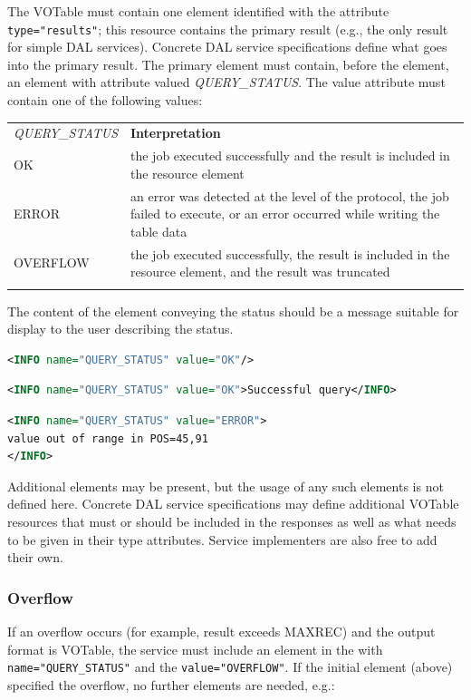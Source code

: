 \documentclass[11pt,letter]{ivoa}
\begin{document}
The VOTable must contain one   element identified with the attribute
\verb|type="results"|; this resource contains the primary result (e.g., the only result
for simple DAL services). Concrete DAL service specifications define what goes
into the primary result. The primary  element must contain, before the
 element, an
 element with attribute  valued \emph{QUERY\_STATUS}. The value
attribute must contain one of the following values:

\begin{tabular}{l p{8cm}}
\sptablerule
\emph{QUERY\_STATUS}&\textbf{Interpretation}\\
\sptablerule
OK & the job executed successfully and the result is included in the
resource element\\
ERROR & an error was detected at the level of the protocol, the job failed to
execute, or an error occurred while writing the table data \\
OVERFLOW & the job executed successfully, the result is included in the
resource element, and the result was truncated \\
\sptablerule
\label{tab:query-status}
\end{tabular}

The content of the  element conveying the status should be a message
suitable for display to the user describing the status.

\begin{lstlisting}[language=XML]
<INFO name="QUERY_STATUS" value="OK"/>
\end{lstlisting}

\begin{lstlisting}[language=XML]
<INFO name="QUERY_STATUS" value="OK">Successful query</INFO>
\end{lstlisting}

\begin{lstlisting}[language=XML]
<INFO name="QUERY_STATUS" value="ERROR">
value out of range in POS=45,91
</INFO>
\end{lstlisting}

Additional  elements may be present, but the usage of any such elements
is not defined here. Concrete DAL service specifications may define additional
VOTable resources that must or should be included in the responses as
well as what needs to be given in their type attributes.
Service implementers are also free to add their own.

\subsubsection{Overflow}
\label{sec:response-overflow}
If an overflow occurs (for example, result exceeds MAXREC) and the output format
is VOTable, the service must include an  element in the 
with \verb|name="QUERY_STATUS"| and the \verb|value="OVERFLOW"|. If the initial
 element (above) specified the overflow, no further elements are needed,
e.g.:
\end{document}
